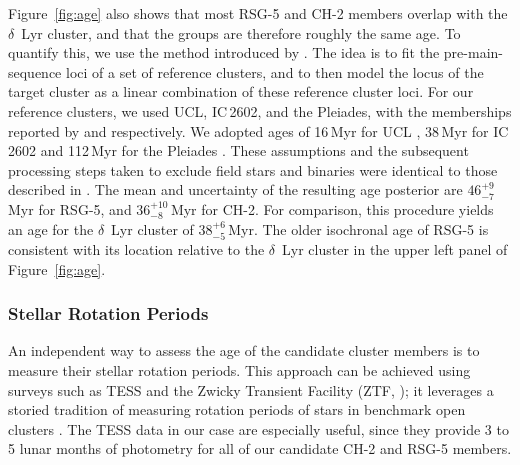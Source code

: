 \documentclass[12pt,twocolumn]{aastex63}
\begin{document}
Figure~\ref{fig:age} also shows that most RSG-5 and CH-2 members
overlap with the $\delta$~Lyr cluster, and that the groups are
therefore roughly the same age.  To quantify this, we use the method
introduced by \citet[][their Section~6.3]{gagne_mutau_2020}.  The idea
is to fit the pre-main-sequence loci of a set of reference clusters,
and to then model the locus of the target cluster as a linear
combination of these reference cluster loci.  For our reference
clusters, we used UCL, IC\,2602, and the Pleiades, with the
memberships reported by \citet{Damiani2019} and
\cite{CantatGaudin2018a} respectively.  We adopted ages of 16\,Myr for
UCL \citep{pecaut_star_2016}, 38\,Myr for IC\,2602
\citep{david_ages_2015,randich_gaiaeso_2018}
and 112\,Myr for the Pleiades \citep{dahm_2015}.  These assumptions
and the subsequent processing steps taken to exclude field stars and
binaries were identical to those described in
\citet{bouma_kep1627_2022}.  The mean and uncertainty of the resulting
age posterior are $46^{+9}_{-7}$\,Myr for RSG-5, and
$36^{+10}_{-8}$\,Myr for CH-2.  For comparison, this procedure yields
an age for the $\delta$~Lyr cluster of $38^{+6}_{-5}$\,Myr.  The
older isochronal age of RSG-5 is consistent with its location
relative to the $\delta$~Lyr cluster in the upper left panel of
Figure~\ref{fig:age}.


\subsubsection{Stellar Rotation Periods}
\label{sec:rotation}

An independent way to assess the age of the candidate cluster members
is to measure their stellar rotation periods.  This approach can be
achieved using surveys such as TESS \citep{ricker_transiting_2015} and
the Zwicky Transient Facility (ZTF, \citealt{bellm_zwicky_2019}); it
leverages a storied tradition of measuring rotation periods of stars
in benchmark open clusters \citep[see
{e.g.},][]{skumanich_time_1972,curtis_rup147_2020}.  The TESS data in
our case are especially useful, since they provide 3 to 5 lunar months
of photometry for all of our candidate CH-2 and RSG-5 members.
\end{document}

